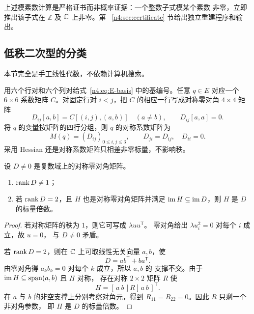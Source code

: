 \begin{remark}
上述模素数计算是严格证书而非概率证据：一个整数子式模某个素数
非零，立即推出该子式在 \(\mathbb Z\) 及 \(\mathbb C\) 上非零。第
~\ref{n4:sec:certificate} 节给出独立重建程序和输出。
\end{remark}

\subsection{低秩二次型的分类}\label{n4:sec:classification}

本节完全是手工线性代数，不依赖计算机搜索。

用六个行对和六个列对给式~\eqref{n4:eq:E-basis} 中的基编号。任意
\(q\in E\) 对应一个 \(6\times6\) 系数矩阵 \(C\)。对固定行对
\(i<j\)，把 \(C\) 的相应一行写成对称零对角 \(4\times4\) 矩阵
\[
  D_{ij}[a,b]=C[(i,j),(a,b)]\quad(a\neq b),\qquad
  D_{ij}[a,a]=0.
\]
将 \(q\) 的变量按矩阵的四行分组，则 \(q\) 的对称系数矩阵为
\begin{equation}\label{n4:eq:block-matrix}
  M(q)=(D_{ij})_{0\leq i,j\leq3},\qquad
  D_{ji}=D_{ij},\quad D_{ii}=0.
\end{equation}
采用 Hessian 还是对称系数矩阵只相差非零标量，不影响秩。

\begin{lemma}\label{n4:lem:zero-diagonal}
设 \(D\neq0\) 是复数域上的对称零对角矩阵。
\begin{enumerate}[label=(\roman*)]
  \item \(\operatorname{rank} D\neq1\)；
  \item 若 \(\operatorname{rank} D=2\)，且 \(H\) 也是对称零对角矩阵并满足
  \(\operatorname{im} H\subseteq\operatorname{im} D\)，则 \(H\) 是 \(D\) 的标量倍数。
\end{enumerate}
\end{lemma}

\begin{proof}
若对称矩阵的秩为 \(1\)，则它可写成 \(\lambda uu^{\mathsf T}\)。
零对角给出 \(\lambda u_i^2=0\) 对每个 \(i\) 成立，故 \(u=0\)，
与 \(D\neq0\) 矛盾。

若 \(\operatorname{rank} D=2\)，则在 \(\mathbb C\) 上可取线性无关向量 \(a,b\)，使
\[
  D=ab^{\mathsf T}+ba^{\mathsf T}.
\]
由零对角得 \(a_kb_k=0\) 对每个 \(k\) 成立，所以 \(a,b\) 的
支撑不交。由于 \(\operatorname{im} H\subseteq\operatorname{span}(a,b)\) 且 \(H\) 对称，
存在对称 \(2\times2\) 矩阵 \(R\) 使
\[
  H=[\,a\ b\,]R[\,a\ b\,]^{\mathsf T}.
\]
在 \(a\) 与 \(b\) 的非空支撑上分别考察对角元，得到
\(R_{11}=R_{22}=0\)。因此 \(R\) 只剩一个非对角参数，
即 \(H\) 是 \(D\) 的标量倍数。
\end{proof}

